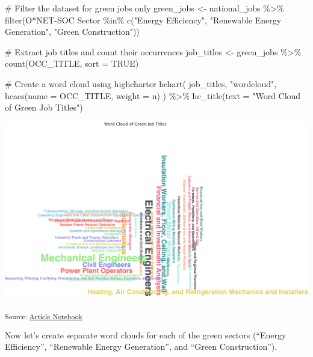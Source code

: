 \documentclass[
  letterpaper,
  DIV=11,
  numbers=noendperiod]{scrartcl}
\newenvironment{Shaded}{\begin{snugshade}}{\end{snugshade}}
\newcommand{\AttributeTok}[1]{\textcolor[rgb]{0.40,0.45,0.13}{#1}}
\newcommand{\CommentTok}[1]{\textcolor[rgb]{0.37,0.37,0.37}{#1}}
\newcommand{\ConstantTok}[1]{\textcolor[rgb]{0.56,0.35,0.01}{#1}}
\newcommand{\FunctionTok}[1]{\textcolor[rgb]{0.28,0.35,0.67}{#1}}
\newcommand{\NormalTok}[1]{\textcolor[rgb]{0.00,0.23,0.31}{#1}}
\newcommand{\OtherTok}[1]{\textcolor[rgb]{0.00,0.23,0.31}{#1}}
\newcommand{\SpecialCharTok}[1]{\textcolor[rgb]{0.37,0.37,0.37}{#1}}
\newcommand{\StringTok}[1]{\textcolor[rgb]{0.13,0.47,0.30}{#1}}
\begin{document}
\begin{Shaded}
\begin{Highlighting}[]
\CommentTok{\# Filter the dataset for green jobs only}
\NormalTok{green\_jobs }\OtherTok{\textless{}{-}}\NormalTok{ national\_jobs }\SpecialCharTok{\%\textgreater{}\%}
  \FunctionTok{filter}\NormalTok{(}\StringTok{\textasciigrave{}}\AttributeTok{O*NET{-}SOC Sector}\StringTok{\textasciigrave{}} \SpecialCharTok{\%in\%} \FunctionTok{c}\NormalTok{(}\StringTok{"Energy Efficiency"}\NormalTok{, }\StringTok{"Renewable Energy Generation"}\NormalTok{, }\StringTok{"Green Construction"}\NormalTok{))}

\CommentTok{\# Extract job titles and count their occurrences}
\NormalTok{job\_titles }\OtherTok{\textless{}{-}}\NormalTok{ green\_jobs }\SpecialCharTok{\%\textgreater{}\%}
  \FunctionTok{count}\NormalTok{(OCC\_TITLE, }\AttributeTok{sort =} \ConstantTok{TRUE}\NormalTok{)}

\CommentTok{\# Create a word cloud using highcharter}
\FunctionTok{hchart}\NormalTok{(}
\NormalTok{  job\_titles, }
  \StringTok{"wordcloud"}\NormalTok{, }
  \FunctionTok{hcaes}\NormalTok{(}\AttributeTok{name =}\NormalTok{ OCC\_TITLE, }\AttributeTok{weight =}\NormalTok{ n)}
\NormalTok{) }\SpecialCharTok{\%\textgreater{}\%}
  \FunctionTok{hc\_title}\NormalTok{(}\AttributeTok{text =} \StringTok{"Word Cloud of Green Job Titles"}\NormalTok{)}
\end{Highlighting}
\end{Shaded}

\includegraphics{index_files/figure-pdf/unnamed-chunk-16-1.pdf}

\textsubscript{Source:
\href{https://beeckcenter.github.io/climate-equity-workforce/index-preview.html}{Article
Notebook}}

Now let's create separate word clouds for each of the green sectors
(``Energy Efficiency'', ``Renewable Energy Generation'', and ``Green
Construction'').
\end{document}
